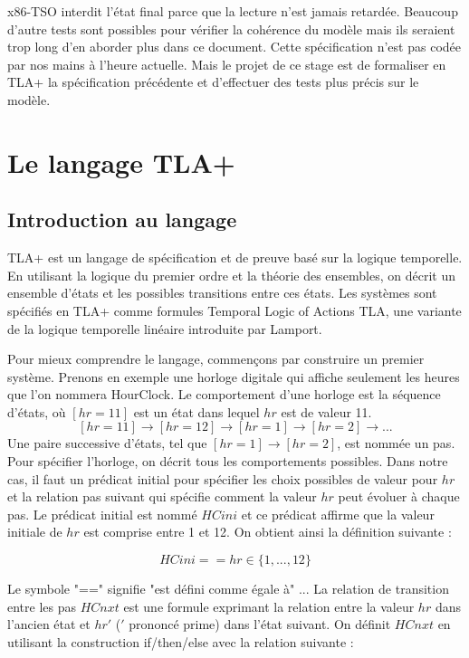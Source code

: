 \documentclass[12pt,a4paper]{article}
\begin{document}
x86-TSO interdit l'état final parce que la lecture n'est jamais retardée.
Beaucoup d'autre tests sont possibles pour vérifier la cohérence du modèle mais ils seraient trop long d'en aborder plus dans ce document. Cette spécification n'est pas codée par nos mains à l'heure actuelle. Mais le projet de ce stage est de formaliser en TLA+ la spécification précédente et d'effectuer des tests plus précis sur le modèle.

\section{Le langage TLA+}

\subsection{Introduction au langage}

TLA+ est un langage de spécification et de preuve basé sur la logique temporelle. En utilisant la logique du premier ordre et la théorie des ensembles, on décrit un ensemble d'états et les possibles transitions entre ces états. Les systèmes sont spécifiés en TLA+ comme formules Temporal Logic
of Actions TLA, une variante de la logique temporelle linéaire introduite par Lamport.

Pour mieux comprendre le langage, commençons par construire un premier système. Prenons en exemple une horloge digitale qui affiche seulement les heures que l'on nommera HourClock. Le comportement d'une horloge est la séquence d'états, où $[hr = 11]$ est un état dans lequel $ hr $ est de valeur 11.
$$ [hr = 11] \rightarrow [hr = 12] \rightarrow [hr = 1] \rightarrow [hr = 2] \rightarrow ...$$
Une paire successive d'états, tel que $[hr = 1] \rightarrow [hr = 2]$, est nommée un pas.
Pour spécifier l'horloge, on décrit tous les comportements possibles. Dans notre cas, il faut un prédicat initial pour spécifier les choix possibles de valeur pour $hr$ et la relation pas suivant qui spécifie comment la valeur $hr$ peut évoluer à chaque pas.
Le prédicat initial est nommé $HCini$ et ce prédicat affirme que la valeur initiale de $hr$ est comprise entre 1 et 12. On obtient ainsi la définition suivante :

$$ HCini == hr \in \{1,...,12\}$$

Le symbole "==" signifie "est défini comme égale à" ... 
La relation de transition entre les pas $HCnxt$ est une formule exprimant la relation entre la valeur $hr$ dans l'ancien état et $hr'$ ($'$ prononcé prime) dans l'état suivant. On définit $HCnxt$ en utilisant la construction if/then/else avec la relation suivante :   
\end{document}
